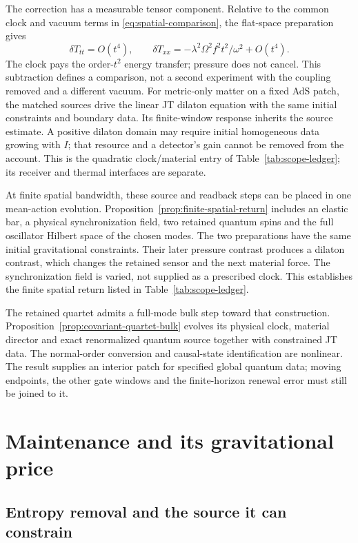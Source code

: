 \documentclass[12pt,a4paper]{article}
\begin{document}
The correction has a measurable tensor component. Relative to the
common clock and vacuum terms in \eqref{eq:spatial-comparison}, the
flat-space preparation gives
\begin{equation}
 \delta T_{tt}=O(t^4),\qquad
 \delta T_{xx}=-\lambda^2\Omega^2 f^2t^2/\omega^2+O(t^4).
\end{equation}
The clock pays the order-$t^2$ energy transfer; pressure does not cancel.
This subtraction defines a comparison, not a second experiment with
the coupling removed and a different vacuum. For metric-only matter
on a fixed AdS patch, the matched sources drive the linear JT dilaton
equation with the same initial constraints and boundary data. Its
finite-window response inherits the source estimate. A positive
dilaton domain may require initial homogeneous data growing with $I$;
that resource and a detector's gain cannot be removed from the account.
This is the quadratic clock/material entry of
Table~\ref{tab:scope-ledger}; its receiver and thermal interfaces are separate.

At finite spatial bandwidth, these source and readback steps can be
placed in one mean-action evolution. Proposition~\ref{prop:finite-spatial-return}
includes an elastic bar, a physical synchronization field, two retained
quantum spins and the full oscillator Hilbert space of the chosen modes.
The two preparations have the same initial gravitational constraints.
Their later pressure contrast produces a dilaton contrast, which changes
the retained sensor and the next material force. The synchronization
field is varied, not supplied as a prescribed clock. This establishes the finite spatial return listed in
Table~\ref{tab:scope-ledger}.

The retained quartet admits a full-mode bulk step toward that construction.
Proposition~\ref{prop:covariant-quartet-bulk} evolves its physical clock,
material director and exact renormalized quantum source together with
constrained JT data. The normal-order conversion and causal-state
identification are nonlinear. The result supplies an interior patch for
specified global quantum data; moving endpoints, the other gate windows
and the finite-horizon renewal error must still be joined to it.

\section{Maintenance and its gravitational price}
\label{sec:gap}

\subsection{Entropy removal and the source it can constrain}
\label{sec:maintenance}
\end{document}
